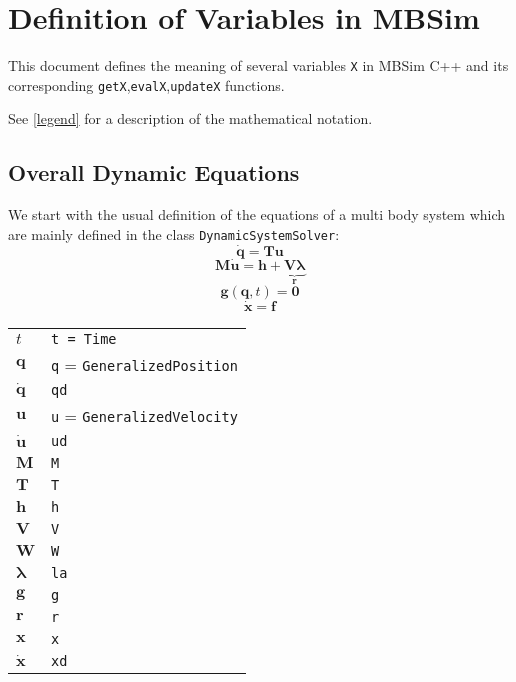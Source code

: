 \documentclass{article}
\newcommand{\bs}[1]{\boldsymbol #1}
\begin{document}
\section{Definition of Variables in MBSim}

This document defines the meaning of several variables \texttt{X} in MBSim C++ and its corresponding \texttt{getX},\texttt{evalX},\texttt{updateX} functions.

See \ref{legend} for a description of the mathematical notation.


\subsection{Overall Dynamic Equations}

We start with the usual definition of the equations of a multi body system which are mainly defined in the class \texttt{DynamicSystemSolver}:
\begin{equation}
  \dot{\bs{q}}=\bs{T}\bs{u}
\end{equation}
\begin{equation}
  \bs{M}\dot{\bs{u}}=\bs{h}+\underbrace{\bs{V}\bs{\lambda}}_{\bs{r}}
  \label{M}
\end{equation}
\begin{equation}
  \bs{g}(\bs{q},t)=\bs{0}
\end{equation}
\begin{equation}
  \dot{\bs{x}}=\bs{f}
\end{equation}

\begin{tabular}{|l|l|}
  \hline
  $t$ & \texttt{t = Time} \\
  $\bs{q}$ & \texttt{q} = \texttt{GeneralizedPosition} \\
  $\dot{\bs{q}}$ & \texttt{qd} \\
  $\bs{u}$ & \texttt{u} = \texttt{GeneralizedVelocity} \\
  $\dot{\bs{u}}$ & \texttt{ud} \\
  $\bs{M}$ & \texttt{M} \\
  $\bs{T}$ & \texttt{T} \\
  $\bs{h}$ & \texttt{h} \\
  $\bs{V}$ & \texttt{V} \\
  $\bs{W}$ & \texttt{W} \\
  $\bs{\lambda}$ & \texttt{la} \\
  $\bs{g}$ & \texttt{g} \\
  $\bs{r}$ & \texttt{r} \\
  $\bs{x}$ & \texttt{x} \\
  $\dot{\bs{x}}$ & \texttt{xd} \\
  \hline
\end{tabular}
\end{document}
